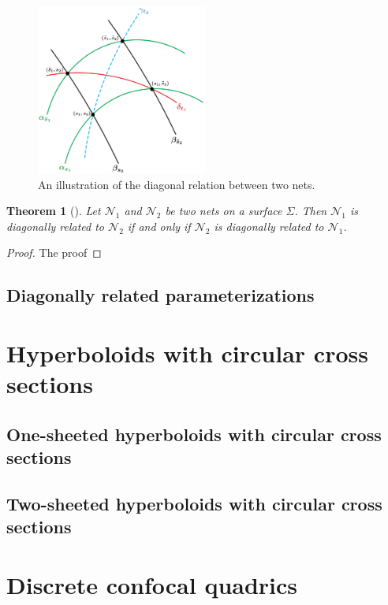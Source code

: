 \documentclass[12pt,a4paper]{article}
\newtheorem{theorem}{Theorem}[section]
\theoremstyle{definition}
\theoremstyle{remark}
\begin{document}
\begin{figure}[h]
    \centering
    \includegraphics[width=0.5\textwidth]{diagonally_related_diagram.png}
    \caption{An illustration of the diagonal relation between two nets.}
    \label{fig:diagonally-related-nets}
\end{figure}

\begin{theorem}[]
\label{thm:symmetric-definition-diagonal-nets}
Let $\mathcal{N}_1$ and $\mathcal{N}_2$ be two nets on a surface $\Sigma$. Then $\mathcal{N}_1$ is diagonally related to
$\mathcal{N}_2$ if and only if $\mathcal{N}_2$ is diagonally related to $\mathcal{N}_1$.
\end{theorem}

\begin{proof}
    The proof
\end{proof}

\subsection{Diagonally related parameterizations}
\pagebreak
\section{Hyperboloids with circular cross sections}
\subsection{One-sheeted hyperboloids with circular cross sections}
\subsection{Two-sheeted hyperboloids with circular cross sections}
\pagebreak
\section{Discrete confocal quadrics}
\pagebreak
\end{document}

